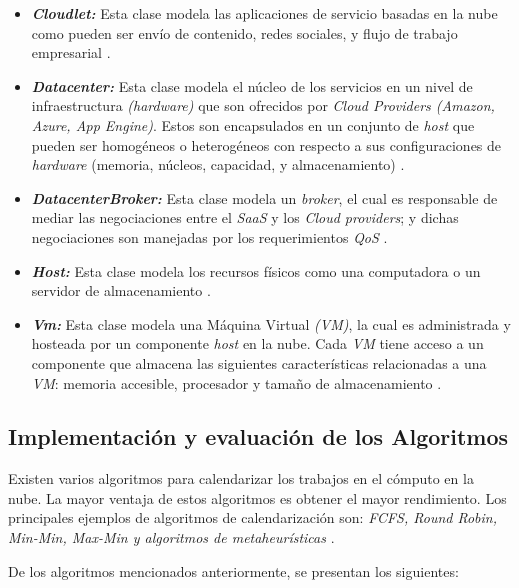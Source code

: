 \documentclass[jou,apacite]{apa6}
\begin{document}
\begin{itemize}
	\item \textit{\textbf{Cloudlet:}} Esta clase modela las aplicaciones de servicio basadas en la nube como pueden ser env\'io de contenido, redes sociales, y flujo de trabajo empresarial \cite{calheiros2011cloudsim}.
	\item \textit{ \textbf{Datacenter:}} Esta clase modela el núcleo de los servicios en un nivel de infraestructura \textit{(hardware)} que son ofrecidos por \textit{Cloud Providers (Amazon, Azure, App Engine)}. Estos son encapsulados en un conjunto de \textit{host} que pueden ser homogéneos o heterogéneos con respecto a sus configuraciones de \textit{hardware} (memoria, n\'ucleos, capacidad, y almacenamiento) \cite{calheiros2011cloudsim}.
	\item \textit{ \textbf{DatacenterBroker:}} Esta clase modela un \textit{broker}, el cual es responsable de mediar las negociaciones entre el \textit{SaaS} y los \textit{Cloud providers}; y dichas negociaciones son manejadas por los requerimientos \textit{QoS} \cite{calheiros2011cloudsim}.
	\item  \textit{\textbf{Host:}} Esta clase modela los recursos f\'isicos como una computadora o un servidor de almacenamiento \cite{calheiros2011cloudsim}.
	\item  \textit{\textbf{Vm:}} Esta clase modela una M\'aquina Virtual \textit{(VM)}, la cual es administrada y hosteada por un componente \textit{host} en la nube. Cada \textit{VM} tiene acceso a un componente que almacena las siguientes características relacionadas a una \textit{VM}: memoria accesible, procesador y tamaño de almacenamiento \cite{calheiros2011cloudsim}.
\end{itemize}

\subsection{Implementaci\'on y evaluación de los Algoritmos}

Existen varios algoritmos para calendarizar los trabajos en el c\'omputo en la nube. La mayor ventaja de estos algoritmos es obtener el mayor rendimiento. Los principales ejemplos de algoritmos de calendarizaci\'on son: \textit{FCFS, Round Robin, Min-Min, Max-Min y algoritmos de metaheurísticas}  \cite{shimpy2014different}.



De los algoritmos mencionados anteriormente, se presentan los siguientes:
\end{document}
